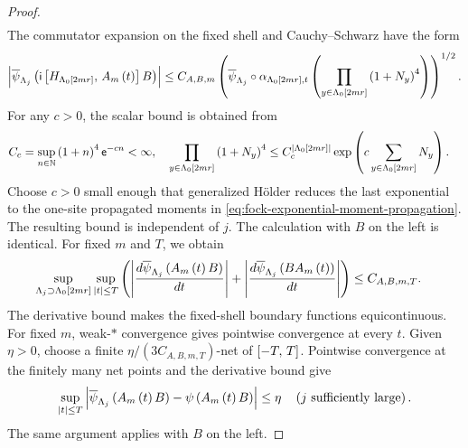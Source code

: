 \documentclass[11pt,a4paper]{article}
\theoremstyle{plain}
\theoremstyle{definition}
\theoremstyle{remark}
\begin{document}
\begin{proof}
$$\begin{aligned}
\end{aligned}$$
The commutator expansion on the fixed shell and Cauchy--Schwarz have the form
$$\begin{aligned}
\abs{
\fun{\oastate[\overline{\psi}_{\Lambda_j}]}{
\imunit\commutator{H_{\Lambda_0[2mr]}}{\fun{A_m}{t}}B}}
\leq
C_{A,B,m}
\rbk{\fun{\oastate[\overline{\psi}_{\Lambda_j}] \circ \alpha_{\Lambda_0[2mr],t}}
{\prod_{y\in \Lambda_0[2mr]}\rbk{1+N_y}^{4}}}^{1/2}.
\end{aligned}$$
For any $c>0$, the scalar bound is obtained from
$$\begin{aligned}
C_c
& =
\sup_{n\in\mathbb{N}}\left( 1+n \right)^{4}\mathsf{e}^{-cn}
<
\infty,
\quad
\prod_{y\in \Lambda_0[2mr]}\left( 1+N_y \right)^{4}
\leq
C_c^{\left| \Lambda_0[2mr] \right|}
\exp \left( c\sum_{y\in \Lambda_0[2mr]}N_y \right).
\end{aligned}$$
Choose $c>0$ small enough that generalized H\"older reduces the last exponential to the one-site propagated
moments in \eqref{eq:fock-exponential-moment-propagation}.
The resulting bound is independent of $j$.
The calculation with $B$ on the left is identical.
For fixed $m$ and $T$, we obtain
$$\begin{aligned}
\sup_{\Lambda_j \supset \Lambda_0[2 m r]}\sup_{\abs{t} \leq T}
\rbk{
\abs{\od{\fun{\oastate[\overline{\psi}_{\Lambda_j}]}{\fun{A_m}{t}B}}{t}}
+
\abs{\od{\fun{\oastate[\overline{\psi}_{\Lambda_j}]}{B\fun{A_m}{t}}}{t}}}
& \leq
C_{A,B,m,T}.
\end{aligned}$$
The derivative bound makes the fixed-shell boundary functions equicontinuous.
For fixed $m$, weak-$\ast$ convergence gives pointwise convergence at every $t$.
Given $\eta>0$, choose a finite $\eta/(3C_{A,B,m,T})$-net of $\left[ -T,\,T \right]$.
Pointwise convergence at the finitely many net points and the derivative bound give
$$\begin{aligned}
\sup_{\abs{t}\leq T}
\abs{
\fun{\oastate[\overline{\psi}_{\Lambda_j}]}{\fun{A_m}{t}B}
-
\fun{\oastate[\psi]}{\fun{A_m}{t}B}}
\leq
\eta
\quad
\rbk{j\text{ sufficiently large}}.
\end{aligned}$$
The same argument applies with $B$ on the left.


\end{proof}
\end{document}
